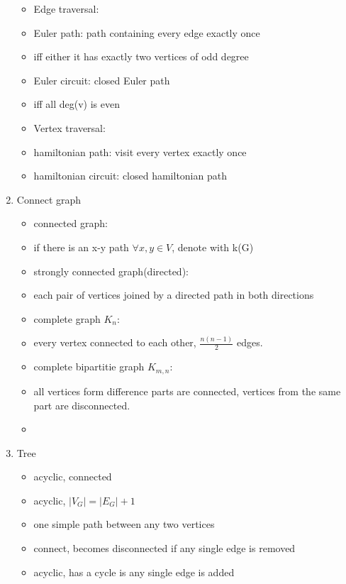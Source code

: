 \documentclass[11pt, a4paper]{article}
\begin{document}
\begin{enumerate}
\begin{itemize}
                \item Edge traversal:
                \item Euler path: path containing every edge exactly once
                \item iff either it has exactly two vertices of odd degree
                \item Euler circuit: closed Euler path
                \item iff all deg(v) is even
                \item Vertex traversal:
                \item hamiltonian path: visit every vertex exactly once
                \item hamiltonian circuit: closed hamiltonian path
            \end{itemize}
        \item Connect graph
            \begin{itemize}
                \item connected graph:
                \item if there is an x-y path $\forall x,y \in V$, denote with k(G)
                \item strongly connected graph(directed):
                \item each pair of vertices joined by a directed path in both directions
                \item complete graph $K_n$:
                \item every vertex connected to each other, $\frac {n(n-1)}{2}$ edges.
                \item complete bipartitie graph $K_{m,n}$:
                \item all vertices form difference parts are connected, vertices from the same part are disconnected.
                \item 
            \end{itemize}
        \item Tree
            \begin{itemize}
                \item acyclic, connected
                \item acyclic, $|V_G| = |E_G| + 1$
                \item one simple path between any two vertices
                \item connect, becomes disconnected if any single edge is removed
                \item acyclic, has a cycle is any single edge is added

\end{itemize}
\end{enumerate}
\end{document}
